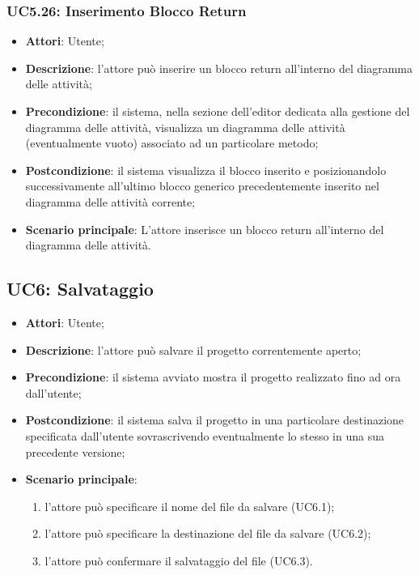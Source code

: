 \subsubsection{UC5.26: Inserimento Blocco Return}
\label{UC5.26}
\begin{itemize}
	\item \textbf{Attori}: Utente;
	\item \textbf{Descrizione}: l'attore può inserire un blocco return all'interno del diagramma delle attività;
	\item \textbf{Precondizione}: il sistema, nella sezione dell'editor dedicata alla gestione del diagramma delle attività, visualizza un diagramma delle attività (eventualmente vuoto) associato ad un particolare metodo;
	\item \textbf{Postcondizione}: il sistema visualizza il blocco inserito e posizionandolo successivamente all'ultimo blocco generico precedentemente inserito nel diagramma delle attività corrente;
	\item \textbf{Scenario principale}: L'attore inserisce un blocco return all'interno del diagramma delle attività.
\end{itemize}

\subsection{UC6: Salvataggio}
\label{UC6}
\begin{itemize}
	\item \textbf{Attori}: Utente;
	\item \textbf{Descrizione}: l'attore può salvare il progetto correntemente aperto;
	\item \textbf{Precondizione}: il sistema avviato mostra il progetto realizzato fino ad ora dall'utente;
	\item \textbf{Postcondizione}: il sistema salva il progetto in una particolare destinazione specificata dall'utente sovrascrivendo eventualmente lo stesso in una sua precedente versione;
	\item \textbf{Scenario principale}:
	\begin{enumerate}
		\item l'attore può specificare il nome del file da salvare (UC6.1);
		\item l'attore può specificare la destinazione del file da salvare (UC6.2);
		\item l'attore può confermare il salvataggio del file (UC6.3).
	\end{enumerate}
\end{itemize}

